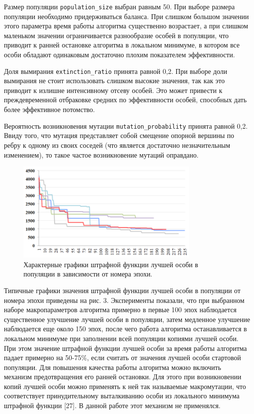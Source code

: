 Размер популяции \texttt{population\_size} выбран равным 50.
При выборе размера популяции необходимо придерживаться баланса.
При слишком большом значении этого параметра время работы алгоритма существенно возрастает, а при слишком маленьком значении ограничивается разнообразие особей в популяции, что приводит к ранней остановке алгоритма в локальном минимуме, в котором все особи обладают одинаковым достаточно плохим показателем эффективности.

Доля вымирания \texttt{extinction\_ratio} принята равной 0,2.
При выборе доли вымирания не стоит использовать слишком высокие значения, так как это приводит к излишне интенсивному отсеву особей. Это может привести к преждевременной отбраковке средних по эффективности особей, способных дать более эффективное потомство.

Вероятность возникновения мутации \texttt{mutation\_probability} принята равной 0,2.
Ввиду того, что мутация представляет собой смещение опорной вершины по ребру к одному из своих соседей (что является достаточно незначительным изменением), то такое частое возникновение мутаций оправдано.

\begin{figure}[ht]
	\centering
		\includegraphics[width=0.8\textwidth]{./pics/text_2_genetic/chart1.png}
	\caption{Характерные графики штрафной функции лучшей особи в популяции в зависимости от номера эпохи.}
	\label{fig:text_2_genetic_chart1}
\end{figure}

Типичные графики значения штрафной функции лучшей особи в популяции от номера эпохи приведены на рис. 3.
Эксперименты показали, что при выбранном наборе макропараметров алгоритма примерно в первые 100 эпох наблюдается существенное улучшение лучшей особи в популяции, затем медленное улучшение наблюдается еще около 150 эпох, после чего работа алгоритма останавливается в локальном минимуме при заполнении всей популяции копиями лучшей особи.
При этом значение штрафной функции лучшей особи за время работы алгоритма падает примерно на 50-75\%, если считать от значения лучшей особи стартовой популяции.
Для повышения качества работы алгоритма можно включить механизм предотвращения его ранней остановки.
Для этого при возникновении копий лучшей особи можно применять к ней так называемые макромутации, что соответствует принудительному выталкиванию особи из локального минимума штрафной функции [27].
В данной работе этот механизм не применялся.

